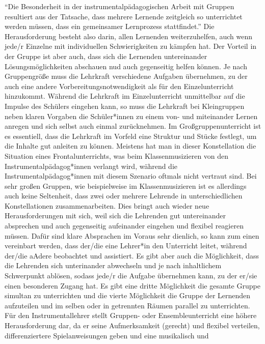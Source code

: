 \enquote{Die Besonderheit in der instrumentalpädagogischen Arbeit mit Gruppen
resultiert aus der Tatsache, dass mehrere Lernende zeitgleich so unterrichtet
werden müssen, dass ein gemeinsamer Lernprozess stattfindet.}
\autocite[221]{busch:grundwissen_instrumentalpaedagogik} Die Herausforderung
besteht also darin, allen Lernenden weiterzuhelfen, auch wenn jede/r Einzelne
mit individuellen Schwierigkeiten zu kämpfen hat. Der Vorteil in der Gruppe ist
aber auch, dass sich die Lernenden untereinander Lösungsmöglichkeiten abschauen
nud auch gegenseitig helfen können. Je nach Gruppengröße muss die Lehrkraft
verschiedene Aufgaben übernehmen, zu der auch eine andere
Vorbereitungsnotwendigkeit als für den Einzelunterricht hinzukommt. Während die
Lehrkraft im Einzelunterricht unmittelbar auf die Impulse des Schülers eingehen
kann, so muss die Lehrkraft bei Kleingruppen neben klaren Vorgaben die
Schüler*innen zu einem von- und miteinander Lernen anregen und sich selbst auch
einmal zurücknehmen. Im Großgruppenunterricht ist es essentiell, dass die
Lehrkraft im Vorfeld eine Struktur und Stücke festlegt, um die Inhalte gut
anleiten zu können.\autocite[220]{busch:grundwissen_instrumentalpaedagogik}
Meistens hat man in dieser Konstellation die Situation eines Frontalunterrichts,
was beim Klassenmusizieren von den Instrumentalpädagog*innen verlangt wird,
während die Instrumentalpädagog*innen mit diesem Szenario oftmals nicht vertraut
sind. Bei sehr großen Gruppen, wie beispielweise im Klassenmusizieren ist es
allerdings auch keine Seltenheit, dass zwei oder mehrere Lehrende in
unterschiedlichen Konstellationen zusammenarbeiten. Dies bringt auch wieder neue
Herausforderungen mit sich, weil sich die Lehrenden gut untereinander absprechen
und auch gegenseitig aufeinander eingehen und flexibel reagieren müssen. Dafür
sind klare Absprachen im Voraus sehr dienlich, so kann zum einen vereinbart
werden, dass der/die eine Lehrer*in den Unterricht leitet, während der/die
aAdere beobachtet und assistiert. Es gibt aber auch die Möglichkeit, dass die
Lehrenden sich unterinander abwechseln und je nach inhaltlichem Schwerpunkt
ablösen, sodass jede/r die Aufgabe übernehmen kann, zu der er/sie einen
besonderen Zugang hat. Es gibt eine dritte Möglichkeit die gesamte Gruppe
simultan zu unterrichten und die vierte Möglichkeit die Gruppe der Lernenden
aufzuteilen und im selben oder in getrennten Räumen parallel zu unterrichten.
Für den Instrumentallehrer stellt Gruppen- oder Ensembleunterricht eine höhere
Herausforderung dar, da er seine Aufmerksamkeit (gerecht) und flexibel
verteilen, differenziertere Spielanweisungen geben und eine musikalisch und
